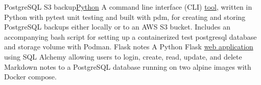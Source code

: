 \datedsubsection{}
{PostgreSQL S3 backup}{\href{https://github.com/JacobArchambault?tab=repositories&q=&type=&language=python&sort=}{Python}}
{A command line interface (CLI) \href{https://github.com/JacobArchambault/pgbackup}{tool}, written in Python with pytest unit testing and built with pdm, for creating and storing PostgreSQL backups either locally or to an AWS S3 bucket. Includes an accompanying bash script for setting up a containerized test postgresql database and storage volume with Podman.}
\datedsubsection{}
{Flask notes}{}
{A Python Flask \href{https://github.com/JacobArchambault/flask_notes}{web application} using SQL Alchemy allowing users to login, create, read, update, and delete Markdown notes to a PostgreSQL database running on two alpine images with Docker compose.}
